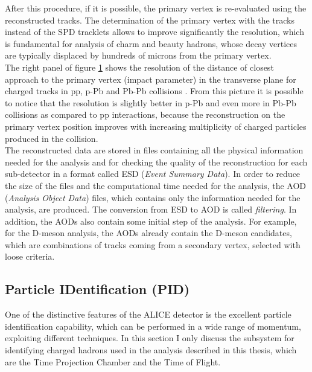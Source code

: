 \documentclass[b5paper,10pt,twoside,oldstyle,classica]{toptesi}
\begin{document}
\begin{figure}[tb]
\begin{center}
\label{tracking}
\end{center}
\end{figure} After this procedure, if it is possible, the primary vertex is re-evaluated using the reconstructed tracks. The determination of the primary vertex with the tracks instead of the SPD tracklets allows to improve significantly the resolution, which is fundamental for analysis of charm and beauty hadrons, whose decay vertices are typically displaced by hundreds of microns from the primary vertex.\\
The right panel of figure \ref{tracking} shows the resolution of the distance of closest approach to the primary vertex (impact parameter) in the transverse plane for charged tracks in pp, p-Pb and Pb-Pb collisions \cite{Abelev:2014ffa}. From this picture it is possible to notice that the resolution is slightly better in p-Pb and even more in Pb-Pb collisions as compared to pp interactions, because the reconstruction on the primary vertex position improves with increasing multiplicity of charged particles produced in the collision.\\
The reconstructed data are stored in files containing all the physical information needed for the analysis and for checking the quality of the reconstruction for each sub-detector in a format called ESD (\textit{Event Summary Data}). In order to reduce the size of the files and the computational time needed for the analysis, the AOD (\textit{Analysis Object Data}) files, which contains only the information needed for the analysis, are produced. The conversion from ESD to AOD is called \textit{filtering}. In addition, the AODs also contain some initial step of the analysis. For example, for the D-meson analysis, the AODs already contain the D-meson candidates, which are combinations of tracks coming from a secondary vertex, selected with loose criteria.   
\subsection{Particle IDentification (PID)}
\label{PID_sec} 
One of the distinctive features of the ALICE detector is the excellent particle identification capability, which can be performed in a wide range of momentum, exploiting different techniques. In this section I only discuss the subsystem for identifying charged hadrons  used in the analysis described in this thesis, which are the Time Projection Chamber and the Time of Flight. 
\end{document}
